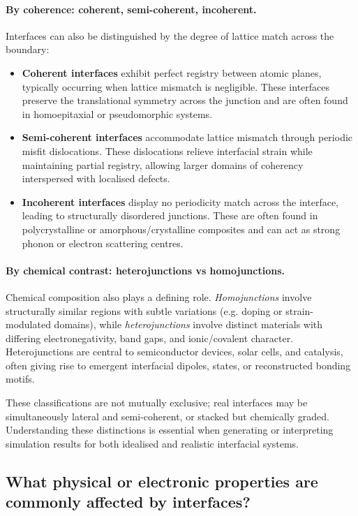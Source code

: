 \paragraph{By coherence: coherent, semi-coherent, incoherent.}
Interfaces can also be distinguished by the degree of lattice match across the boundary:

\begin{itemize}
    \item \textbf{Coherent interfaces} exhibit perfect registry between atomic planes, typically occurring when lattice
    mismatch is negligible. These interfaces preserve the translational symmetry across the junction and are often
    found in homoepitaxial or pseudomorphic systems.
    \item \textbf{Semi-coherent interfaces} accommodate lattice mismatch through periodic misfit dislocations. These
    dislocations relieve interfacial strain while maintaining partial registry, allowing larger domains of coherency
    interspersed with localised defects.
    \item \textbf{Incoherent interfaces} display no periodicity match across the interface, leading to structurally
    disordered junctions. These are often found in polycrystalline or amorphous/crystalline composites and can act as
    strong phonon or electron scattering centres.
\end{itemize}

\paragraph{By chemical contrast: heterojunctions vs homojunctions.}
Chemical composition also plays a defining role. \emph{Homojunctions} involve structurally similar regions with
subtle variations (e.g. doping or strain-modulated domains), while \emph{heterojunctions} involve distinct materials
with differing electronegativity, band gaps, and ionic/covalent character. Heterojunctions are central to
semiconductor devices, solar cells, and catalysis, often giving rise to emergent interfacial dipoles, states, or
reconstructed bonding motifs.

These classifications are not mutually exclusive; real interfaces may be simultaneously lateral and semi-coherent,
or stacked but chemically graded. Understanding these distinctions is essential when generating or interpreting
simulation results for both idealised and realistic interfacial systems.

\subsection{What physical or electronic properties are commonly affected by interfaces?}

